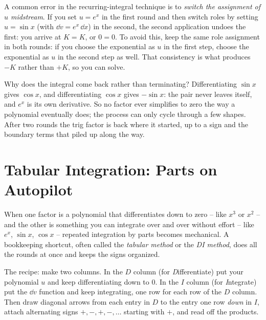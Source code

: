 \begin{trapbox}
A common error in the recurring-integral technique is to \emph{switch the assignment of $u$
midstream}. If you set $u = e^x$ in the first round and then switch roles by setting
$u = \sin x$ (with $\dd v = e^x\,\dd x$) in the second, the second application
undoes the first: you arrive at $K = K$, or $0=0$. To avoid this, keep the same role
assignment in both rounds: if you choose the exponential as $u$ in the first step,
choose the exponential as $u$ in the second step as well. That consistency is what
produces $-K$ rather than $+K$, so you can solve.
\end{trapbox}

\begin{happeningbox}
Why does the integral come back rather than terminating? Differentiating
$\sin x$ gives $\cos x$, and differentiating $\cos x$ gives $-\sin x$: the pair
never leaves itself, and $e^x$ is its own derivative. So no factor
ever simplifies to zero the way a polynomial eventually does; the process can only
cycle through a few shapes. After two rounds the trig
factor is back where it started, up to a sign and the boundary terms that
piled up along the way.
\end{happeningbox}

\section{Tabular Integration: Parts on Autopilot}
\label{ch23:tabular}

When one factor is a polynomial that differentiates down to zero -- like $x^3$ or
$x^2$ -- and the other is something you can integrate over and over without effort
-- like $e^x$, $\sin x$, $\cos x$ -- repeated integration by parts becomes
mechanical. A bookkeeping shortcut, often called the \emph{tabular
method} or the \emph{DI method}, does all the rounds at once and keeps the
signs organized.

The recipe: make two columns. In the $D$ column (for
\emph{D}ifferentiate) put your polynomial $u$ and keep differentiating down to
$0$. In the $I$ column (for \emph{I}ntegrate) put the $\dd v$ function and keep
integrating, one row for each row of the $D$ column. Then draw diagonal arrows
from each entry in $D$ to the entry one row \emph{down} in $I$, attach alternating
signs $+,-,+,-,\dots$ starting with $+$, and read off the products.

